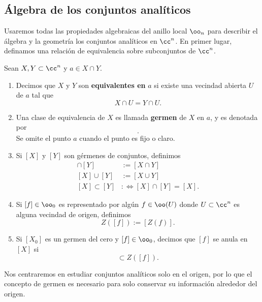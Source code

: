 \subsection{Álgebra de los conjuntos analíticos}

Usaremos todas las propiedades algebraicas del anillo local $\oo_n$ para describir el álgebra y la geometría los conjuntos analíticos en $\cc^n$. En primer lugar, definamos una relación de equivalencia sobre subconjuntos de $\cc^n$.
\begin{definition}
	Sean $X,Y\subset \cc^n$ y $a\in X\cap Y$.
	\begin{enumerate}
		\item Decimos  que $X$ y $Y$ son \textbf{equivalentes en} $a$ si existe una vecindad abierta $U$ de $a$ tal que
		\begin{equation*}
			X\cap U = Y\cap U.
		\end{equation*}
		\item Una clase de equivalencia de $X$ es  llamada \textbf{germen} de $X$ en $a$, y es denotada por
		\begin{equation*}
			[X_a].
		\end{equation*}
		Se omite el punto $a$ cuando el punto es fijo o claro.
		\item Si $[X]$ y $[Y]$ son gérmenes de conjuntos, definimos
		\begin{align*}
			[X]\cap[Y]&:=[X\cap Y]\\
			[X]\cup[Y]&:=[X\cup Y]\\
			[X]\subset[Y]&:\Longleftrightarrow [X]\cap[Y]=[X].
		\end{align*}
		\item Si $[f]\in\oo_0$ es representado por algún $f\in\oo(U)$ donde $U\subset\cc^n$ es alguna vecindad de origen, definimos
		\begin{equation}
			Z([f]):=[Z(f)].
		\end{equation}
		\item [5. ]Si $[X_0]$ es un germen del cero y $[f]\in\oo_0$, decimos que $[f]$ se anula en $[X]$ si
		\begin{equation*}
			[X]\subset Z([f]).
		\end{equation*}
	\end{enumerate}
\end{definition}

Nos centraremos en estudiar conjuntos analíticos solo en el origen, por lo que el concepto de germen es necesario para solo conservar su información alrededor del origen.

